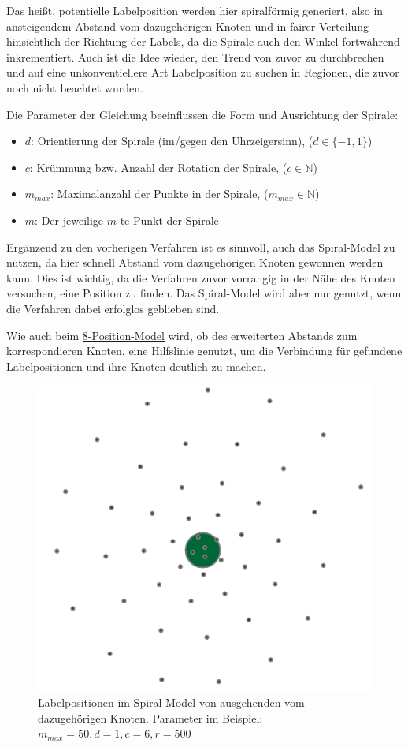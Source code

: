 Das heißt, potentielle Labelposition werden hier spiralförmig generiert, also in ansteigendem Abstand vom dazugehörigen Knoten und in fairer Verteilung hinsichtlich der Richtung der Labels, da die Spirale auch den Winkel fortwährend inkrementiert.
Auch ist die Idee wieder, den Trend von zuvor zu durchbrechen und auf eine unkonventiellere Art Labelposition zu suchen in Regionen, die zuvor noch nicht beachtet wurden.

Die Parameter der Gleichung beeinflussen die Form und Ausrichtung der Spirale:
\begin{itemize}
    \item $d$: Orientierung der Spirale (im/gegen den Uhrzeigersinn), ($d \in \{-1, 1 \}$)
    \item $c$: Krümmung bzw. Anzahl der Rotation der Spirale, ($c \in \mathbb{N}$)
    \item $m_{max}$: Maximalanzahl der Punkte in der Spirale, ($m_{max} \in \mathbb{N}$)
    \item $m$: Der jeweilige $m$-te Punkt der Spirale
\end{itemize}

Ergänzend zu den vorherigen Verfahren ist es sinnvoll, auch das Spiral-Model zu nutzen, da hier schnell Abstand vom dazugehörigen Knoten gewonnen werden kann.
Dies ist wichtig, da die Verfahren zuvor vorrangig in der Nähe des Knoten versuchen, eine Position zu finden. Das Spiral-Model wird aber nur genutzt,
wenn die Verfahren dabei erfolglos geblieben sind.

Wie auch beim \hyperref[subsubsec:8pos]{8-Position-Model} wird, ob des erweiterten Abstands zum korrespondieren Knoten, eine Hilfslinie genutzt,
um die Verbindung für gefundene Labelpositionen und ihre Knoten deutlich zu machen.

\begin{figure}[H]
    \centering
    \includegraphics[scale=0.4]{../img/sample}
    \caption{Labelpositionen im Spiral-Model von ausgehenden vom dazugehörigen Knoten.
    Parameter im Beispiel: $m_{max}=50,d=1,c=6,r=500$}
    \label{fig:spiral}
\end{figure}